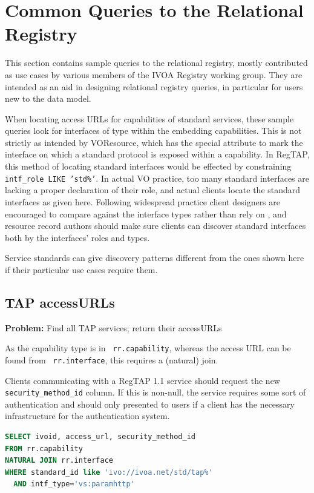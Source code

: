 \documentclass[11pt,a4paper]{ivoa}
\newcommand{\rtent}[1]{\texttt{\color{rtcolor} #1}}
\begin{document}
\section{Common Queries to the Relational Registry}

\label{sample_queries}

This section contains sample queries to the relational registry,
mostly contributed as use cases by various members of the IVOA Registry
working group.  They are intended as an aid in designing relational
registry queries, in particular for users new to the data model.

When locating access URLs for capabilities of standard services, these
sample queries look for interfaces of type  within
the embedding capabilities.  This is not strictly as intended by
VOResource, which has the special  attribute to mark the
interface on which a standard protocol is exposed within a capability.
In RegTAP, this method of locating standard interfaces would be effected
by constraining \texttt{intf\_role LIKE 'std\%'}.  In actual VO
practice, too many standard interfaces are lacking a proper declaration
of their role, and actual clients locate the standard interfaces as
given here.  Following widespread practice client designers are
encouraged to compare against the interface types rather than rely on
, and resource record authors should make sure
clients can discover standard interfaces both by the interfaces' roles
and types.

Service standards can give discovery patterns different from the ones
shown here if their particular use cases require them.

\subsection{TAP accessURLs}
\textbf{Problem:} Find all TAP services; return their accessURLs

As the capability type is in 
\rtent{rr.capability}, whereas the access URL can be
found from 
\rtent{rr.interface}, this requires
a (natural) join.

Clients communicating with a RegTAP 1.1 service should request the new
\rtent{security\_method\_id} column.  If this is non-null, the service
requires some sort of authentication and should only presented to users
if a client has the necessary infrastructure for the authentication
system.

\begin{lstlisting}[language=SQL,flexiblecolumns=true]
SELECT ivoid, access_url, security_method_id
FROM rr.capability
NATURAL JOIN rr.interface
WHERE standard_id like 'ivo://ivoa.net/std/tap%'
  AND intf_type='vs:paramhttp'
\end{lstlisting}
\end{document}
